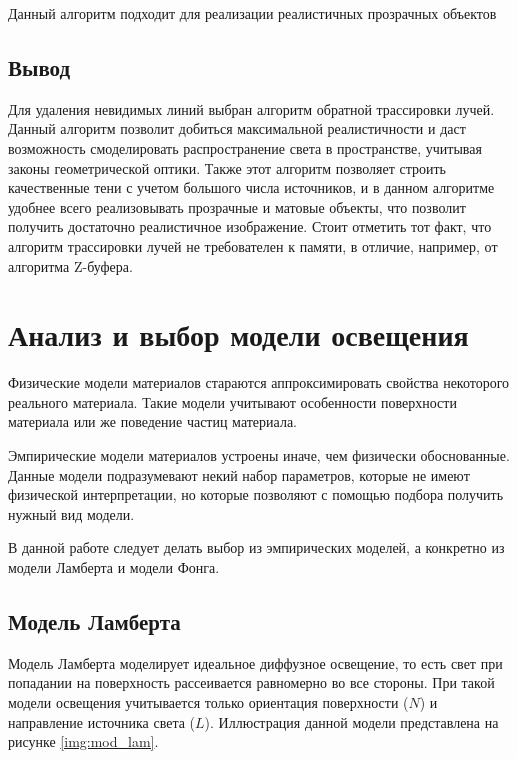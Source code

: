 Данный алгоритм подходит для реализации реалистичных прозрачных объектов


\subsection{Вывод}

Для удаления невидимых линий выбран алгоритм обратной трассировки лучей. Данный алгоритм позволит добиться максимальной реалистичности и даст возможность смоделировать распространение света в пространстве, учитывая законы геометрической оптики. Также этот алгоритм позволяет строить качественные тени с учетом большого числа источников, и в данном алгоритме удобнее всего реализовывать прозрачные и матовые объекты, что позволит получить достаточно реалистичное изображение. Стоит отметить тот факт, что алгоритм трассировки лучей не требователен к памяти, в отличие, например, от алгоритма Z-буфера.



\section{Анализ и выбор модели освещения}

Физические модели материалов стараются аппроксимировать свойства некоторого реального материала. Такие модели учитывают особенности поверхности материала или же поведение частиц материала.

Эмпирические модели материалов устроены иначе, чем физически обоснованные. Данные модели подразумевают некий набор параметров, которые не имеют физической интерпретации, но которые позволяют с помощью подбора получить нужный вид модели.

В данной работе следует делать выбор из эмпирических моделей, а конкретно из модели Ламберта и модели Фонга.

\subsection{Модель Ламберта}

Модель Ламберта \cite{lamber_fong} моделирует идеальное диффузное освещение, то есть свет при попадании на поверхность рассеивается равномерно во все стороны. При такой модели освещения учитывается только ориентация поверхности ($N$) и направление источника света ($L$). Иллюстрация данной модели представлена на рисунке \ref{img:mod_lam}.

